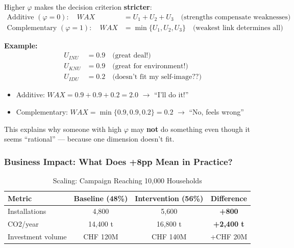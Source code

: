 \begin{proposition}
Higher $\varphi$ makes the decision criterion \textbf{stricter}:
\begin{align}
\text{Additive } (\varphi = 0): \quad WAX &= U_1 + U_2 + U_3 \quad \text{(strengths compensate weaknesses)} \\
\text{Complementary } (\varphi = 1): \quad WAX &= \min\{U_1, U_2, U_3\} \quad \text{(weakest link determines all)}
\end{align}
\end{proposition}

\textbf{Example:}
\begin{align*}
U_{INU} &= 0.9 \quad \text{(great deal!)} \\
U_{KNU} &= 0.9 \quad \text{(great for environment!)} \\
U_{IDU} &= 0.2 \quad \text{(doesn't fit my self-image??)}
\end{align*}

\begin{itemize}
\item Additive: $WAX = 0.9 + 0.9 + 0.2 = 2.0$ $\rightarrow$ ``I'll do it!''
\item Complementary: $WAX = \min\{0.9, 0.9, 0.2\} = 0.2$ $\rightarrow$ ``No, feels wrong''
\end{itemize}

This explains why someone with high $\varphi$ may \textbf{not} do something even though it seems ``rational'' --- because one dimension doesn't fit.

\subsubsection{Business Impact: What Does +8pp Mean in Practice?}

\begin{table}[htbp]
\centering
\caption{Scaling: Campaign Reaching 10,000 Households}
\begin{tabular}{@{}lccc@{}}
\toprule
\textbf{Metric} & \textbf{Baseline (48\%)} & \textbf{Intervention (56\%)} & \textbf{Difference} \\
\midrule
Installations & 4,800 & 5,600 & \textbf{+800} \\
CO2/year & 14,400 t & 16,800 t & \textbf{+2,400 t} \\
Investment volume & CHF 120M & CHF 140M & +CHF 20M \\
\bottomrule
\end{tabular}
\end{table}

